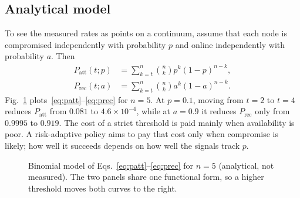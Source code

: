 \documentclass[conference]{IEEEtran}
\begin{document}
\subsection{Analytical model}
\label{sec:analytic}
To see the measured rates as points on a continuum, assume that each node is compromised independently with probability $p$ and online independently with probability $a$. Then
\begin{align}
  P_{\text{att}}(t;p) &= \sum_{k=t}^{n} \binom{n}{k} p^{k} (1-p)^{n-k}, \label{eq:patt}\\
  P_{\text{rec}}(t;a) &= \sum_{k=t}^{n} \binom{n}{k} a^{k} (1-a)^{n-k}. \label{eq:prec}
\end{align}
Fig.~\ref{fig:analytic} plots~\eqref{eq:patt}--\eqref{eq:prec} for $n=5$. At $p=0.1$, moving from $t=2$ to $t=4$ reduces $P_{\text{att}}$ from $0.081$ to $4.6\times10^{-4}$, while at $a=0.9$ it reduces $P_{\text{rec}}$ only from $0.9995$ to $0.919$. The cost of a strict threshold is paid mainly when availability is poor. A risk-adaptive policy aims to pay that cost only when compromise is likely; how well it succeeds depends on how well the signals track $p$.

\begin{figure}[t]
\centering
{}
\caption{Binomial model of Eqs.~\eqref{eq:patt}--\eqref{eq:prec} for $n=5$ (analytical, not measured). The two panels share one functional form, so a higher threshold moves both curves to the right.}
\label{fig:analytic}
\end{figure}
\end{document}
